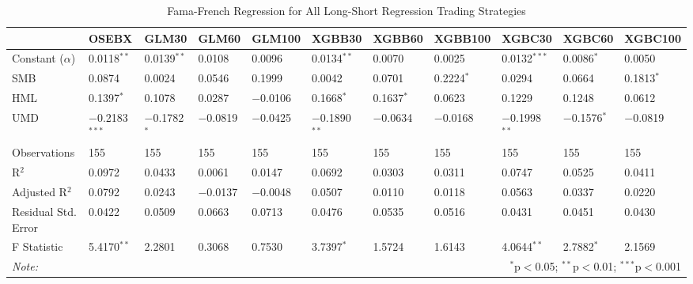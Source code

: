 \begin{table}
\centering 
\caption{Fama-French Regression for All Long-Short Regression Trading Strategies}
\vspace{1em}
\label{table:models_without_L-all}
\begin{tabularx}{\textwidth}{lXXXXXXXXXX} 
\toprule
 & OSEBX & GLM30 & GLM60 & GLM100 & XGBB30 & XGBB60 & XGBB100 & XGBC30 & XGBC60 & XGBC100 \\ 
\midrule
 Constant ($\alpha$) & 0.0118$^{**}$ & 0.0139$^{**}$ & 0.0108 & 0.0096 & 0.0134$^{**}$ & 0.0070 & 0.0025 & 0.0132$^{***}$ & 0.0086$^{*}$ & 0.0050 \\ 
 SMB & 0.0874 & 0.0024 & 0.0546 & 0.1999 & 0.0042 & 0.0701 & 0.2224$^{*}$ & 0.0294 & 0.0664 & 0.1813$^{*}$ \\ 
 HML & 0.1397$^{*}$ & 0.1078 & 0.0287 & $-$0.0106 & 0.1668$^{*}$ & 0.1637$^{*}$ & 0.0623 & 0.1229 & 0.1248 & 0.0612 \\ 
 UMD & $-$0.2183$^{***}$ & $-$0.1782$^{*}$ & $-$0.0819 & $-$0.0425 & $-$0.1890$^{**}$ & $-$0.0634 & $-$0.0168 & $-$0.1998$^{**}$ & $-$0.1576$^{*}$ & $-$0.0819 \\ 
\midrule
 Observations & 155 & 155 & 155 & 155 & 155 & 155 & 155 & 155 & 155 & 155 \\ 
 R$^{2}$ & 0.0972 & 0.0433 & 0.0061 & 0.0147 & 0.0692 & 0.0303 & 0.0311 & 0.0747 & 0.0525 & 0.0411 \\ 
 Adjusted R$^{2}$ & 0.0792 & 0.0243 & $-$0.0137 & $-$0.0048 & 0.0507 & 0.0110 & 0.0118 & 0.0563 & 0.0337 & 0.0220 \\ 
 Residual Std. Error & 0.0422 & 0.0509 & 0.0663 & 0.0713 & 0.0476 & 0.0535 & 0.0516 & 0.0431 & 0.0451 & 0.0430 \\ 
 F Statistic & 5.4170$^{**}$ & 2.2801 & 0.3068 & 0.7530 & 3.7397$^{*}$ & 1.5724 & 1.6143 & 4.0644$^{**}$ & 2.7882$^{*}$ & 2.1569 \\ 
\bottomrule
\textit{Note:} & \multicolumn{10}{r}{$^{*}$p$<$0.05; $^{**}$p$<$0.01; $^{***}$p$<$0.001} \\ 
\end{tabularx} 
\end{table} 

